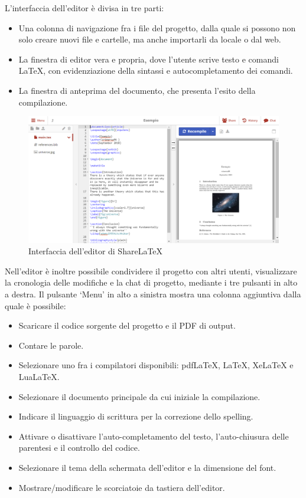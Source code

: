 L'interfaccia dell'editor è divisa in tre parti:
\begin{itemize}
    \item Una colonna di navigazione fra i file del progetto, dalla quale si possono non solo creare nuovi file e cartelle, ma anche importarli da locale o dal web.
    \item La finestra di editor vera e propria, dove l'utente scrive testo e comandi \LaTeX, con evidenziazione della sintassi e autocompletamento dei comandi.
    \item La finestra di anteprima del documento, che presenta l'esito della compilazione.
\end{itemize}
\begin{figure}[h]
    \centering
    \includegraphics[width=\textwidth]{immagini/editor.PNG}
    \caption{Interfaccia dell'editor di ShareLaTeX}
    \label{fig:sharelatex_editor}
\end{figure}
Nell'editor è inoltre possibile condividere il progetto con altri utenti, visualizzare la cronologia delle modifiche e la chat di progetto, mediante i tre pulsanti in alto a destra.
Il pulsante \enquote*{Menu} in alto a sinistra mostra una colonna aggiuntiva dalla quale è possibile:
\begin{itemize}
    \item Scaricare il codice sorgente del progetto e il PDF di output.
    \item Contare le parole.
    \item Selezionare uno fra i compilatori disponibili: pdfLaTeX, \LaTeX, XeLaTeX e LuaLaTeX.
    \item Selezionare il documento principale da cui iniziale la compilazione.
    \item Indicare il linguaggio di scrittura per la correzione dello spelling.
    \item Attivare o disattivare l'auto-completamento del testo, l'auto-chiusura delle parentesi e il controllo del codice.
    \item Selezionare il tema della schermata dell'editor e la dimensione del font.
    \item Mostrare/modificare le scorciatoie da tastiera dell'editor.
\end{itemize}

